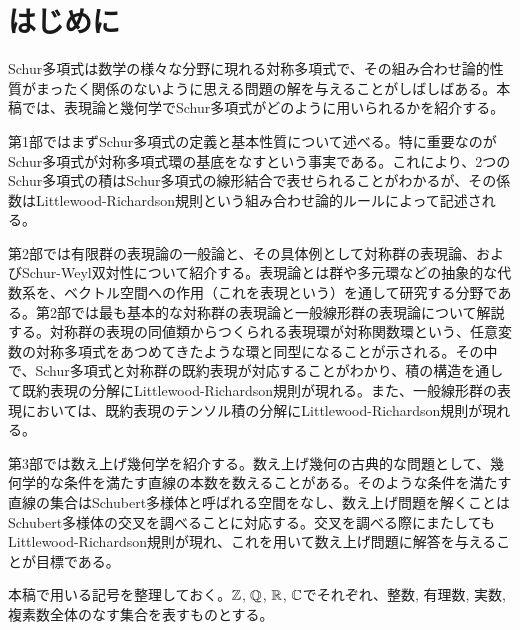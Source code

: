 \chapter*{はじめに}
Schur多項式は数学の様々な分野に現れる対称多項式で、その組み合わせ論的性質がまったく関係のないように思える問題の解を与えることがしばしばある。本稿では、表現論と幾何学でSchur多項式がどのように用いられるかを紹介する。


第1部ではまずSchur多項式の定義と基本性質について述べる。特に重要なのがSchur多項式が対称多項式環の基底をなすという事実である。これにより、2つのSchur多項式の積はSchur多項式の線形結合で表せられることがわかるが、その係数はLittlewood-Richardson規則という組み合わせ論的ルールによって記述される。


第2部では有限群の表現論の一般論と、その具体例として対称群の表現論、およびSchur-Weyl双対性について紹介する。表現論とは群や多元環などの抽象的な代数系を、ベクトル空間への作用（これを表現という）を通して研究する分野である。第2部では最も基本的な対称群の表現論と一般線形群の表現論について解説する。対称群の表現の同値類からつくられる表現環が対称関数環という、任意変数の対称多項式をあつめてきたような環と同型になることが示される。その中で、Schur多項式と対称群の既約表現が対応することがわかり、積の構造を通して既約表現の分解にLittlewood-Richardson規則が現れる。また、一般線形群の表現においては、既約表現のテンソル積の分解にLittlewood-Richardson規則が現れる。


第3部では数え上げ幾何学を紹介する。数え上げ幾何の古典的な問題として、幾何学的な条件を満たす直線の本数を数えることがある。そのような条件を満たす直線の集合はSchubert多様体と呼ばれる空間をなし、数え上げ問題を解くことはSchubert多様体の交叉を調べることに対応する。交叉を調べる際にまたしてもLittlewood-Richardson規則が現れ、これを用いて数え上げ問題に解答を与えることが目標である。


本稿で用いる記号を整理しておく。$\mathbb{Z}$, $\mathbb{Q}$, $\mathbb{R}$, $\mathbb{C}$でそれぞれ、整数, 有理数, 実数, 複素数全体のなす集合を表すものとする。